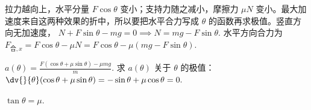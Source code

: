 拉力越向上，水平分量 \(F\cos\theta\) 变小；支持力随之减小，摩擦力 \(\mu N\) 变小。最大加速度来自这两种效果的折中，所以要把水平合力写成 \(\theta\) 的函数再求极值。竖直方向无加速度，
 \(N+F\sin\theta-mg=0 \implies N=mg-F\sin\theta.\) 
水平方向合力为
 \(F_{\text{合},x}=F\cos\theta-\mu N =F\cos\theta-\mu(mg-F\sin\theta).\) 

 \(a(\theta)=\frac{F(\cos\theta+\mu\sin\theta)-\mu mg}{m}.\) 
求 \(a(\theta)\) 关于 \(\theta\) 的极值：
 \(\dv{}{\theta}(\cos\theta+\mu\sin\theta) =-\sin\theta+\mu\cos\theta=0.\) 

 \(\tan\theta=\mu.\) 

